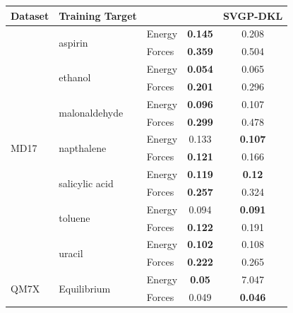 \begin{tabular}{l|llcc}
\toprule
{Dataset} & Training Target & & \oursacro{} & SVGP-DKL\\
\midrule
\multirow{14}{*}{MD17} & \multirow{2}{*}{aspirin} & Energy & \textbf{0.145} & 0.208\\ & &Forces & \textbf{0.359} & 0.504\\
\cmidrule{2-5}
&\multirow{2}{*}{ethanol} & Energy & \textbf{0.054} & 0.065\\ && Forces & \textbf{0.201} & 0.296\\
\cmidrule{2-5}
&\multirow{2}{*}{malonaldehyde} & Energy & \textbf{0.096} & 0.107\\ && Forces & \textbf{0.299} & 0.478\\
\cmidrule{2-5}
&\multirow{2}{*}{napthalene} & Energy & 0.133 & \textbf{0.107}\\ && Forces & \textbf{0.121} & 0.166\\
\cmidrule{2-5}
&\multirow{2}{*}{salicylic acid} & Energy & \textbf{0.119} & \textbf{0.12}\\ && Forces & \textbf{0.257} & 0.324\\
\cmidrule{2-5}
&\multirow{2}{*}{toluene} & Energy & 0.094 & \textbf{0.091}\\ && Forces & \textbf{0.122} & 0.191\\
\cmidrule{2-5}
&\multirow{2}{*}{uracil} & Energy & \textbf{0.102} & 0.108\\ && Forces & \textbf{0.222} & 0.265\\
\hline
\multirow{2}{*}{QM7X} & \multirow{2}{*}{Equilibrium} & Energy & \textbf{0.05} & 7.047\\ && Forces & 0.049 & \textbf{0.046}\\
\bottomrule
\end{tabular}